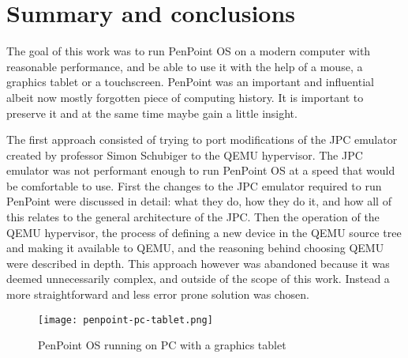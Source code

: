 \clearpage %

\section{Summary and conclusions}

The goal of this work was to run PenPoint OS on a modern computer with
reasonable performance, and be able to use it with the help of a mouse,
a graphics tablet or a touchscreen. PenPoint was an important and influential
albeit now mostly forgotten piece of computing history. It is important to
preserve it and at the same time maybe gain a little insight.


The first approach consisted of trying to port modifications of the JPC
emulator created by professor Simon Schubiger to the QEMU hypervisor.  The JPC
emulator was not performant enough to run PenPoint OS at a speed that would be
comfortable to use.  First the changes to the JPC emulator required to run
PenPoint were discussed in detail: what they do, how they do it, and how all of
this relates to the general architecture of the JPC.  Then the operation of the
QEMU hypervisor, the process of defining a new device in the QEMU source tree
and making it available to QEMU, and the reasoning behind choosing QEMU were
described in depth.  This approach however was abandoned because it was deemed
unnecessarily complex, and outside of the scope of this work.  Instead a more
straightforward and less error prone solution was chosen.

\begin{figure}[!h]
    \centering
    \texttt{[image: penpoint-pc-tablet.png]}
    \caption{PenPoint OS running on PC with a graphics tablet}
    \label{fig:penpoint-pc-tablet}
\end{figure}

